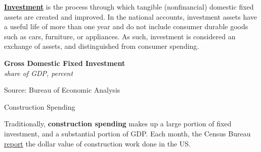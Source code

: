 \documentclass{report}
\makeatletter
\newcommand{\tbllink}[1]{\href{https://raw.githubusercontent.com/bdecon/US-chartbook/master/chartbook/data/#1}{\faTable}}
\newcommand*\short[1]{\expandafter\@gobbletwo\number\numexpr#1\relax}
\newcommand{\sbar}[4]{
		\addplot[ybar stacked, bar width=2.3pt, draw opacity=0, fill=#1] 
			table [x=#2, y=#3, col sep=comma]{#4};}
\newcommand{\absnode}[3]{\node[below right, align=left] at (axis cs: #1,#2) {#3};}
\newcommand{\dateaxisticks}{
		date coordinates in=x, axis line style={draw=none},
		xmax={2023-11-01},
		max space between ticks=40,	    
		xtick={{1990-01-01}, {1992-01-01}, {1994-01-01}, 
			{1996-01-01}, {1998-01-01}, {2000-01-01}, 
			{2002-01-01}, {2004-01-01}, {2006-01-01},
			{2008-01-01}, {2010-01-01}, {2012-01-01}, {2014-01-01},
		    {2016-01-01}, {2018-01-01}, {2020-01-01}, {2022-01-01}, 
		    {2024-01-01}, {2026-01-01}},
		minor xtick={{1989-01-01}, {1991-01-01}, {1993-01-01},
			{1995-01-01}, {1997-01-01}, {1999-01-01}, 
			{2001-01-01}, {2003-01-01}, {2005-01-01}, {2007-01-01},
		    {2009-01-01}, {2011-01-01}, {2013-01-01}, {2015-01-01},
		    {2017-01-01}, {2019-01-01}, {2021-01-01}, {2023-01-01}, 
		    {2025-01-01}, {2027-01-01}},
		enlarge y limits={0.06}, enlarge x limits={0.01},
		}
\newcommand{\bbar}[2]{extra #1 ticks = {{#2}}, extra #1 tick labels = ,
		extra #1 tick style = {grid=major, grid style={thick, black!25}},}
\newcommand{\stdline}[4]{\addplot[very thick, no markers, color=#1] 
		table [x=#2, y=#3, col sep=comma] {#4};	}
\newcommand{\rbars}{
		\fill[color=black!10] (axis cs:{1990-07-01},\pgfkeysvalueof{/pgfplots/ymin}) rectangle 
			(axis cs:{1991-03-01}, \pgfkeysvalueof{/pgfplots/ymax});
		\fill[color=black!10] (axis cs:{2007-12-01},\pgfkeysvalueof{/pgfplots/ymin}) rectangle 
			(axis cs:{2009-07-01}, \pgfkeysvalueof{/pgfplots/ymax});
		\fill[color=black!10] (axis cs:{2001-03-01},\pgfkeysvalueof{/pgfplots/ymin}) rectangle 
			(axis cs:{2001-11-01}, \pgfkeysvalueof{/pgfplots/ymax});
		\fill[color=black!10] (axis cs:{2020-02-01},\pgfkeysvalueof{/pgfplots/ymin}) rectangle 
			(axis cs:{2020-05-01}, \pgfkeysvalueof{/pgfplots/ymax});}
\makeatother
\begin{document}
{\begin{minipage}{0.76\textwidth}
\small \textbf{\href{https://www.bea.gov/resources/learning-center/what-to-know-fixed-assets}{Investment}} is the process through which tangible (nonfinancial) domestic fixed assets are created and improved. In the national accounts, investment assets have a useful life of more than one year and do not include consumer durable goods such as cars, furniture, or appliances. As such, investment is considered an exchange of assets, and distinguished from consumer spending. 

 


\vspace{1mm}

\normalsize \textbf{Gross Domestic Fixed Investment}\\
\footnotesize{\textit{share of GDP, percent}}
\vspace{2.85cm}

\hspace{3mm} 

\footnotesize{Source: Bureau of Economic Analysis} \hfill \tbllink{grossinv_sh.csv} 
\vspace{4mm}

\normalsize Construction Spending
\vspace{-1mm}

\small Traditionally, \textbf{construction spending} makes up a large portion of fixed investment, and a substantial portion of GDP. Each month, the Census Bureau \href{https://www.census.gov/construction/c30/c30index.html}{report} the dollar value of construction work done in the US. 
\end{minipage}

}
\end{document}
